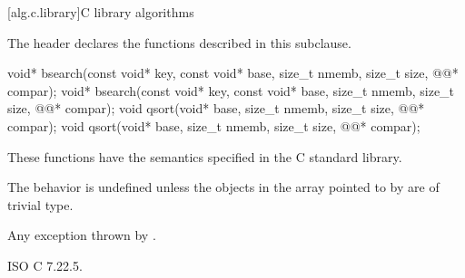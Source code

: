 [alg.c.library]{C library algorithms}

\pnum
{}%
%
\begin{note}
The header 
declares the functions described in this subclause.
\end{note}

%
%
\begin{itemdecl}
void* bsearch(const void* key, const void* base, size_t nmemb, size_t size,
              @@* compar);
void* bsearch(const void* key, const void* base, size_t nmemb, size_t size,
              @@* compar);
void qsort(void* base, size_t nmemb, size_t size, @@* compar);
void qsort(void* base, size_t nmemb, size_t size, @@* compar);
\end{itemdecl}

\begin{itemdescr}
\pnum
\effects
These functions have the semantics specified in the C standard library.

\pnum
\remarks
The behavior is undefined
unless the objects in the array pointed to by 
are of trivial type.

\pnum
\throws
Any exception thrown by .
\end{itemdescr}

\xref
ISO C 7.22.5.
